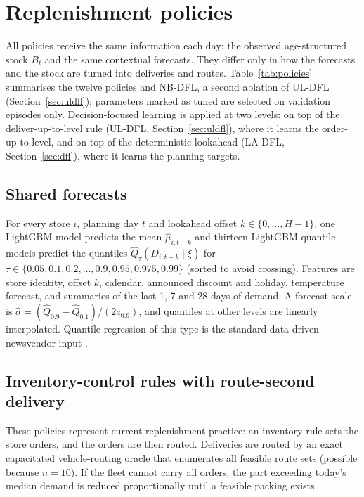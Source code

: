 \section{Replenishment policies}\label{sec:policies}

All policies receive the same information each day: the observed age-structured stock $B_t$ and the same contextual forecasts. They differ only in how the forecasts and the stock are turned into deliveries and routes. Table~\ref{tab:policies} summarises the twelve policies and NB-DFL, a second ablation of UL-DFL (Section~\ref{sec:uldfl}); parameters marked as tuned are selected on validation episodes only. Decision-focused learning is applied at two levels: on top of the deliver-up-to-level rule (UL-DFL, Section~\ref{sec:uldfl}), where it learns the order-up-to level, and on top of the deterministic lookahead (LA-DFL, Section~\ref{sec:dfl}), where it learns the planning targets.

\subsection{Shared forecasts}\label{sec:forecasts}

For every store $i$, planning day $t$ and lookahead offset $k\in\{0,\dots,H-1\}$, one LightGBM model \citep{ke2017lightgbm} predicts the mean $\hat\mu_{i,t+k}$ and thirteen LightGBM quantile models predict the quantiles $\hat Q_{\tau}(D_{i,t+k}\mid\xi)$ for $\tau\in\{0.05,0.1,0.2,\dots,0.9,0.95,0.975,0.99\}$ (sorted to avoid crossing). Features are store identity, offset $k$, calendar, announced discount and holiday, temperature forecast, and summaries of the last 1, 7 and 28 days of demand. A forecast scale is $\hat\sigma=(\hat Q_{0.9}-\hat Q_{0.1})/(2z_{0.9})$, and quantiles at other levels are linearly interpolated. Quantile regression of this type is the standard data-driven newsvendor input \citep{ban2019big,huber2019data}.

\subsection{Inventory-control rules with route-second delivery}\label{sec:rules}

These policies represent current replenishment practice: an inventory rule sets the store orders, and the orders are then routed. Deliveries are routed by an exact capacitated vehicle-routing oracle that enumerates all feasible route sets (possible because $n=10$). If the fleet cannot carry all orders, the part exceeding today's median demand is reduced proportionally until a feasible packing exists.

